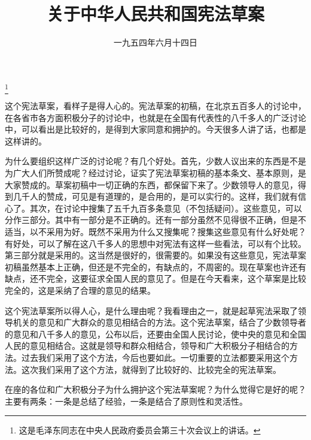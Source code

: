
\title{关于中华人民共和国宪法草案}
\date{一九五四年六月十四日}
\thanks{这是毛泽东同志在中央人民政府委员会第三十次会议上的讲话。}
\maketitle


这个宪法草案，看样子是得人心的。宪法草案的初稿，在北京五百多人的讨论中，在各省市各方面积极分子的讨论中，也就是在全国有代表性的八千多人的广泛讨论中，可以看出是比较好的，是得到大家同意和拥护的。今天很多人讲了话，也都是这样讲的。

为什么要组织这样广泛的讨论呢？有几个好处。首先，少数人议出来的东西是不是为广大人们所赞成呢？经过讨论，证实了宪法草案初稿的基本条文、基本原则，是大家赞成的。草案初稿中一切正确的东西，都保留下来了。少数领导人的意见，得到几千人的赞成，可见是有道理的，是合用的，是可以实行的。这样，我们就有信心了。其次，在讨论中搜集了五千九百多条意见（不包括疑问）。这些意见，可以分作三部分。其中有一部分是不正确的。还有一部分虽然不见得很不正确，但是不适当，以不采用为好。既然不采用为什么又搜集呢？搜集这些意见有什么好处呢？有好处，可以了解在这八千多人的思想中对宪法有这样一些看法，可以有个比较。第三部分就是采用的。这当然是很好的，很需要的。如果没有这些意见，宪法草案初稿虽然基本上正确，但还是不完全的，有缺点的，不周密的。现在草案也许还有缺点，还不完全，这要征求全国人民的意见了。但是在今天看来，这个草案是比较完全的，这是采纳了合理的意见的结果。

这个宪法草案所以得人心，是什么理由呢？我看理由之一，就是起草宪法采取了领导机关的意见和广大群众的意见相结合的方法。这个宪法草案，结合了少数领导者的意见和八千多人的意见，公布以后，还要由全国人民讨论，使中央的意见和全国人民的意见相结合。这就是领导和群众相结合，领导和广大积极分子相结合的方法。过去我们采用了这个方法，今后也要如此。一切重要的立法都要采用这个方法。这次我们采用了这个方法，就得到了比较好的、比较完全的宪法草案。

在座的各位和广大积极分子为什么拥护这个宪法草案呢？为什么觉得它是好的呢？主要有两条：一条是总结了经验，一条是结合了原则性和灵活性。

